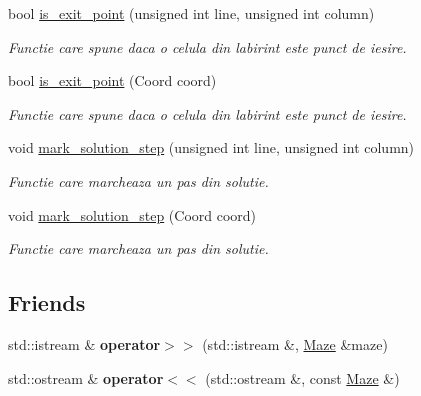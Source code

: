 \begin{DoxyCompactItemize}
bool \hyperlink{classMaze_ac246c826b75f7a89936c4957381589a5}{is\_\-exit\_\-point} (unsigned int line, unsigned int column)
\begin{DoxyCompactList}\small\item\em Functie care spune daca o celula din labirint este punct de iesire. \end{DoxyCompactList}\item 
bool \hyperlink{classMaze_aabd5993906681eef8491618fb2cce4c5}{is\_\-exit\_\-point} (Coord coord)
\begin{DoxyCompactList}\small\item\em Functie care spune daca o celula din labirint este punct de iesire. \end{DoxyCompactList}\item 
void \hyperlink{classMaze_a07a1b1c1187313a16ec8a2823e7a3019}{mark\_\-solution\_\-step} (unsigned int line, unsigned int column)
\begin{DoxyCompactList}\small\item\em Functie care marcheaza un pas din solutie. \end{DoxyCompactList}\item 
void \hyperlink{classMaze_a0b27a912b886cd33a45d53789e4f2f1b}{mark\_\-solution\_\-step} (Coord coord)
\begin{DoxyCompactList}\small\item\em Functie care marcheaza un pas din solutie. \end{DoxyCompactList}\end{DoxyCompactItemize}
\subsection*{Friends}
\begin{DoxyCompactItemize}
\item 
\hypertarget{classMaze_af5844881f8fcd17e2c8e5dc036338f85}{
std::istream \& {\bfseries operator$>$$>$} (std::istream \&, \hyperlink{classMaze}{Maze} \&maze)}
\label{classMaze_af5844881f8fcd17e2c8e5dc036338f85}

\item 
\hypertarget{classMaze_af855ad718bd33714d1e871a802a164b2}{
std::ostream \& {\bfseries operator$<$$<$} (std::ostream \&, const \hyperlink{classMaze}{Maze} \&)}
\label{classMaze_af855ad718bd33714d1e871a802a164b2}

\end{DoxyCompactItemize}


